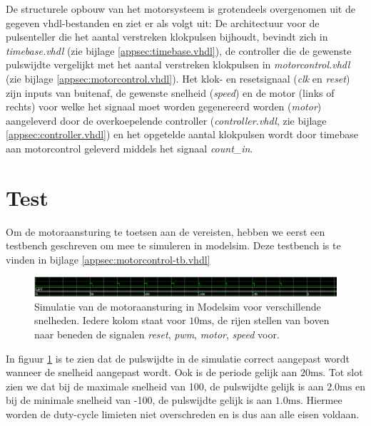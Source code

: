 \documentclass{report}
\begin{document}
De structurele opbouw van het motorsysteem is grotendeels overgenomen uit de gegeven vhdl-bestanden en ziet er als volgt uit:
De architectuur voor de pulsenteller die het aantal verstreken klokpulsen bijhoudt, bevindt zich in \textit{timebase.vhdl} (zie bijlage \ref{appsec:timebase.vhdl}), de controller die de gewenste pulswijdte vergelijkt met het aantal verstreken klokpulsen in \textit{motorcontrol.vhdl} (zie bijlage \ref{appsec:motorcontrol.vhdl}).
Het klok- en resetsignaal (\textit{clk} en \textit{reset}) zijn inputs van buitenaf, de gewenste snelheid (\textit{speed}) en de motor (links of rechts) voor welke het signaal moet worden gegenereerd worden (\textit{motor}) aangeleverd door de overkoepelende controller (\textit{controller.vhdl}, zie bijlage \ref{appsec:controller.vhdl}) en het opgetelde aantal klokpulsen wordt door timebase aan motorcontrol geleverd middels het signaal \textit{count\_in}.

\section{Test}
\label{sec:servo-test}

Om de motoraansturing te toetsen aan de vereisten, hebben we eerst een testbench geschreven om mee te simuleren in modelsim. Deze testbench is te vinden in bijlage \ref{appsec:motorcontrol-tb.vhdl} 

\begin{figure}[H]
	\includegraphics[width=\textwidth]{resource/motor-control-sim}
	\caption{Simulatie van de motoraansturing in Modelsim voor verschillende snelheden. Iedere kolom staat voor $10 \mathrm{ms}$, de rijen stellen van boven naar beneden de signalen \textit{reset}, \textit{pwm}, \textit{motor}, \textit{speed} voor.}
	\label{fig:motorcontrol-sim}
\end{figure}

In figuur \ref{fig:motorcontrol-sim} is te zien dat de pulswijdte in de simulatie correct aangepast wordt wanneer de snelheid aangepast wordt. Ook is de periode gelijk aan $20 \mathrm{ms}$. Tot slot zien we dat bij de maximale snelheid van 100, de pulswijdte gelijk is aan $2.0 \mathrm{ms}$ en bij de minimale snelheid van -100, de pulswijdte gelijk is aan $1.0 \mathrm{ms}$. Hiermee worden de duty-cycle limieten niet overschreden en is dus aan alle eisen voldaan.
\end{document}
